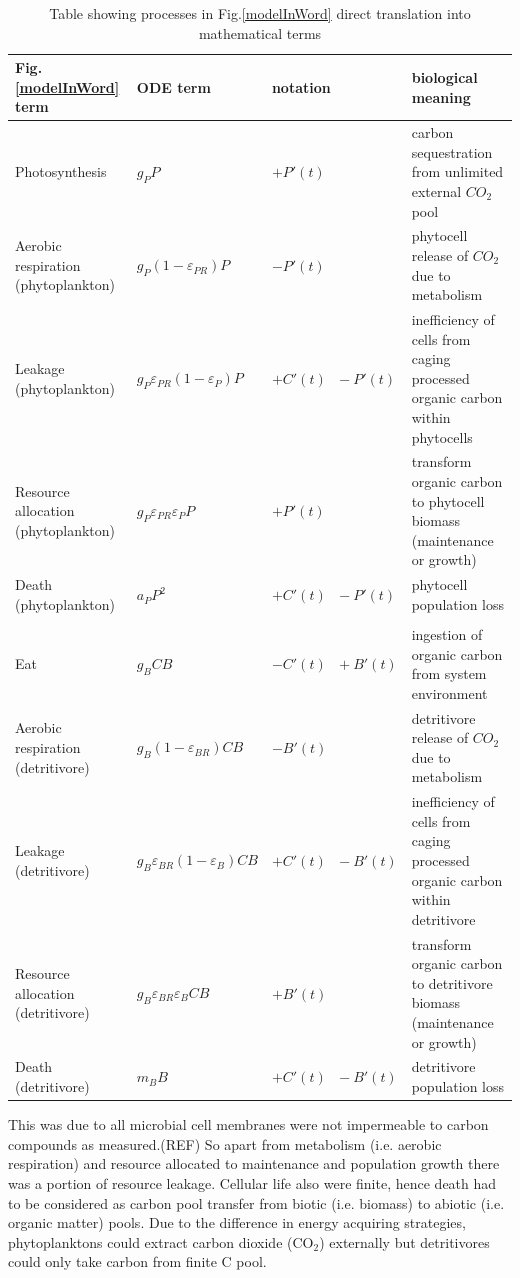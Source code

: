 \documentclass[../thesis.tex]{subfiles} %
\newcommand{\gP}{g_P}
\newcommand{\eP}{\varepsilon_P}
\newcommand{\aP}{a_P}
\newcommand{\ePR}{\varepsilon_{PR}}
\newcommand{\gB}{g_B}
\newcommand{\eB}{\varepsilon_B}
\newcommand{\mB}{m_B}
\newcommand{\eBR}{\varepsilon_{BR}}
\begin{document}
\begin{table}[H]
    \centering
    \caption[Processes in algebra terms]{Table showing processes in Fig.\ref{modelInWord} direct translation into mathematical terms}
    \begin{tabular}{p{.25\linewidth}p{.2\linewidth}p{.2\linewidth}p{.25\linewidth}}\hline
        Fig.\ref{modelInWord} term & ODE term & notation & biological meaning\\\hline
        Photosynthesis &$\gP P$& $+P'(t)$ & carbon sequestration from unlimited external $CO_2$ pool\\
        Aerobic respiration (phytoplankton) &$\gP(1-\ePR)P$& $-P'(t)$ & phytocell release of $CO_2$ due to metabolism\\
        Leakage (phytoplankton) &$\gP\ePR(1-\eP)P$& $+C'(t)\text{ }-P'(t)$ & inefficiency of cells from caging processed organic carbon within phytocells\\
        Resource allocation (phytoplankton) &$\gP\ePR\eP P$& $+P'(t)$ & transform organic carbon to phytocell biomass (maintenance or growth)\\
        Death (phytoplankton) &$\aP P^2$& $+C'(t)\text{ }-P'(t)$ & phytocell population loss\\
        &&&\\
        Eat &$\gB CB$& $-C'(t)\text{ }+B'(t)$ & ingestion of organic carbon from system environment\\
        Aerobic respiration (detritivore) &$\gB(1-\eBR)CB$& $-B'(t)$ & detritivore release of $CO_2$ due to metabolism\\
        Leakage (detritivore) &$\gB\eBR(1-\eB)CB$& $+C'(t)\text{ }-B'(t)$ & inefficiency of cells from caging processed organic carbon within detritivore\\
        Resource allocation (detritivore) &$\gB\eBR\eB CB$& $+B'(t)$ & transform organic carbon to detritivore biomass (maintenance or growth)\\
        Death (detritivore) &$\mB B$& $+C'(t)\text{ }-B'(t)$ & detritivore population loss\\\hline
    \end{tabular}
    \label{termInTab}
\end{table}

This was due to all microbial cell membranes were not impermeable to carbon compounds as measured.(REF)  So apart from metabolism (i.e. aerobic respiration) and resource allocated to maintenance and population growth there was a portion of resource leakage.  Cellular life also were finite, hence death had to be considered as carbon pool transfer from biotic (i.e. biomass) to abiotic (i.e. organic matter) pools.  Due to the difference in energy acquiring strategies, phytoplanktons could extract carbon dioxide (CO$_2$) externally but detritivores could only take carbon from finite C pool.
\end{document}
